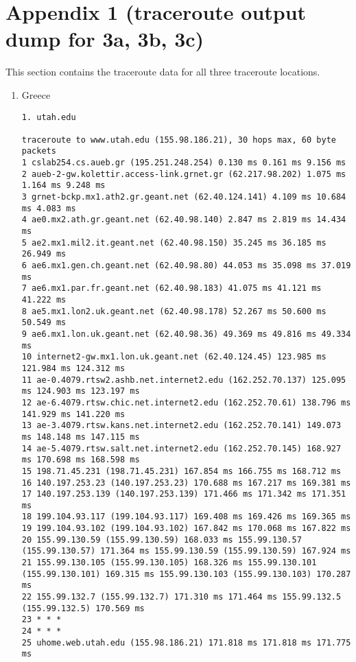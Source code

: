 \documentclass[a4paper]{article}
\begin{document}
\pagebreak

\section{Appendix 1 (traceroute output dump for 3a, 3b, 3c)}

This section contains the traceroute data for all three traceroute locations.

\begin{enumerate}
    \item Greece
        \begin{lstlisting}
1. utah.edu

traceroute to www.utah.edu (155.98.186.21), 30 hops max, 60 byte packets
1 cslab254.cs.aueb.gr (195.251.248.254) 0.130 ms 0.161 ms 9.156 ms
2 aueb-2-gw.kolettir.access-link.grnet.gr (62.217.98.202) 1.075 ms 1.164 ms 9.248 ms
3 grnet-bckp.mx1.ath2.gr.geant.net (62.40.124.141) 4.109 ms 10.684 ms 4.083 ms
4 ae0.mx2.ath.gr.geant.net (62.40.98.140) 2.847 ms 2.819 ms 14.434 ms
5 ae2.mx1.mil2.it.geant.net (62.40.98.150) 35.245 ms 36.185 ms 26.949 ms
6 ae6.mx1.gen.ch.geant.net (62.40.98.80) 44.053 ms 35.098 ms 37.019 ms
7 ae6.mx1.par.fr.geant.net (62.40.98.183) 41.075 ms 41.121 ms 41.222 ms
8 ae5.mx1.lon2.uk.geant.net (62.40.98.178) 52.267 ms 50.600 ms 50.549 ms
9 ae6.mx1.lon.uk.geant.net (62.40.98.36) 49.369 ms 49.816 ms 49.334 ms
10 internet2-gw.mx1.lon.uk.geant.net (62.40.124.45) 123.985 ms 121.984 ms 124.312 ms
11 ae-0.4079.rtsw2.ashb.net.internet2.edu (162.252.70.137) 125.095 ms 124.903 ms 123.197 ms
12 ae-6.4079.rtsw.chic.net.internet2.edu (162.252.70.61) 138.796 ms 141.929 ms 141.220 ms
13 ae-3.4079.rtsw.kans.net.internet2.edu (162.252.70.141) 149.073 ms 148.148 ms 147.115 ms
14 ae-5.4079.rtsw.salt.net.internet2.edu (162.252.70.145) 168.927 ms 170.698 ms 168.598 ms
15 198.71.45.231 (198.71.45.231) 167.854 ms 166.755 ms 168.712 ms
16 140.197.253.23 (140.197.253.23) 170.688 ms 167.217 ms 169.381 ms
17 140.197.253.139 (140.197.253.139) 171.466 ms 171.342 ms 171.351 ms
18 199.104.93.117 (199.104.93.117) 169.408 ms 169.426 ms 169.365 ms
19 199.104.93.102 (199.104.93.102) 167.842 ms 170.068 ms 167.822 ms
20 155.99.130.59 (155.99.130.59) 168.033 ms 155.99.130.57 (155.99.130.57) 171.364 ms 155.99.130.59 (155.99.130.59) 167.924 ms
21 155.99.130.105 (155.99.130.105) 168.326 ms 155.99.130.101 (155.99.130.101) 169.315 ms 155.99.130.103 (155.99.130.103) 170.287 ms
22 155.99.132.7 (155.99.132.7) 171.310 ms 171.464 ms 155.99.132.5 (155.99.132.5) 170.569 ms
23 * * *
24 * * *
25 uhome.web.utah.edu (155.98.186.21) 171.818 ms 171.818 ms 171.775 ms


\end{lstlisting}
\end{enumerate}
\end{document}
